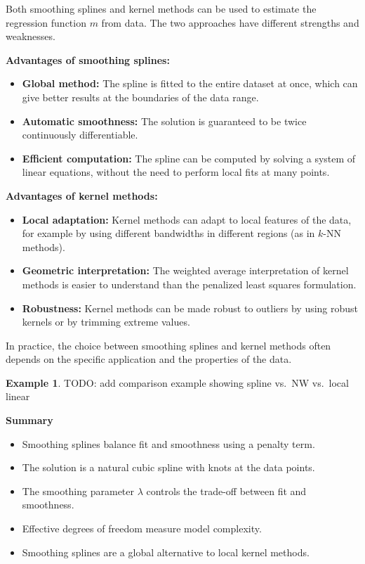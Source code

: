 \documentclass[
  a4paper,
]{article}
\providecommand{\tightlist}{%
  \setlength{\itemsep}{0pt}\setlength{\parskip}{0pt}}
\theoremstyle{definition}
\theoremstyle{definition}
\newtheorem{example}{Example}[section]
\theoremstyle{definition}
\theoremstyle{definition}
\theoremstyle{remark}
\begin{document}
Both smoothing splines and kernel methods can be used to estimate the
regression function \(m\) from data. The two approaches have different
strengths and weaknesses.

\textbf{Advantages of smoothing splines:}

\begin{itemize}
\tightlist
\item
  \textbf{Global method:} The spline is fitted to the entire dataset at once,
  which can give better results at the boundaries of the data range.
\item
  \textbf{Automatic smoothness:} The solution is guaranteed to be twice
  continuously differentiable.
\item
  \textbf{Efficient computation:} The spline can be computed by solving a
  system of linear equations, without the need to perform local fits at
  many points.
\end{itemize}

\textbf{Advantages of kernel methods:}

\begin{itemize}
\tightlist
\item
  \textbf{Local adaptation:} Kernel methods can adapt to local features of the
  data, for example by using different bandwidths in different regions
  (as in \(k\)-NN methods).
\item
  \textbf{Geometric interpretation:} The weighted average interpretation of
  kernel methods is easier to understand than the penalized least squares
  formulation.
\item
  \textbf{Robustness:} Kernel methods can be made robust to outliers by using
  robust kernels or by trimming extreme values.
\end{itemize}

In practice, the choice between smoothing splines and kernel methods
often depends on the specific application and the properties of the data.

\begin{example}
TODO: add comparison example showing spline vs.~NW vs.~local linear
\end{example}

\textbf{Summary}

\begin{itemize}
\tightlist
\item
  Smoothing splines balance fit and smoothness using a penalty term.
\item
  The solution is a natural cubic spline with knots at the data points.
\item
  The smoothing parameter \(\lambda\) controls the trade-off between fit and
  smoothness.
\item
  Effective degrees of freedom measure model complexity.
\item
  Smoothing splines are a global alternative to local kernel methods.
\end{itemize}
\end{document}
